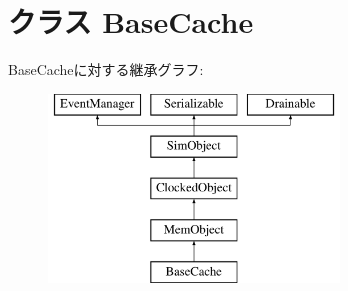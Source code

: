 \hypertarget{classBaseCache_1_1BaseCache}{
\section{クラス BaseCache}
\label{classBaseCache_1_1BaseCache}
}
BaseCacheに対する継承グラフ:\begin{figure}[H]
\begin{center}
\leavevmode
\includegraphics[height=5cm]{classBaseCache_1_1BaseCache}
\end{center}
\end{figure}
